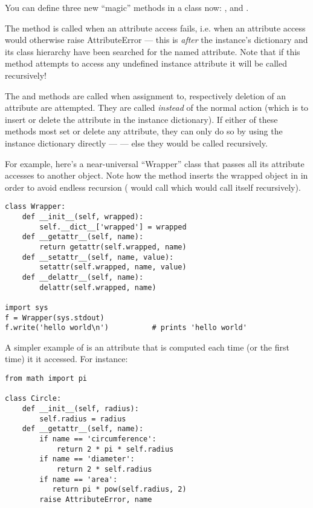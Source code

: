 You can define three new ``magic'' methods in a class now:
, 
and .

The  method is called when an attribute access fails,
i.e. when an attribute access would otherwise raise AttributeError ---
this is {\em after} the instance's dictionary and its class hierarchy
have been searched for the named attribute.  Note that if this method
attempts to access any undefined instance attribute it will be called
recursively!

The  and  methods are called when
assignment to, respectively deletion of an attribute are attempted.
They are called {\em instead} of the normal action (which is to insert
or delete the attribute in the instance dictionary).  If either of
these methods most set or delete any attribute, they can only do so by
using the instance dictionary directly ---  --- else
they would be called recursively.

For example, here's a near-universal ``Wrapper'' class that passes all
its attribute accesses to another object.  Note how the
 method inserts the wrapped object in
 in order to avoid endless recursion
( would call  which would call
itself recursively).

\begin{verbatim}
class Wrapper:
    def __init__(self, wrapped):
        self.__dict__['wrapped'] = wrapped
    def __getattr__(self, name):
        return getattr(self.wrapped, name)
    def __setattr__(self, name, value):
        setattr(self.wrapped, name, value)
    def __delattr__(self, name):
        delattr(self.wrapped, name)

import sys
f = Wrapper(sys.stdout)
f.write('hello world\n')          # prints 'hello world'
\end{verbatim}

A simpler example of  is an attribute that is
computed each time (or the first time) it it accessed.  For instance:

\begin{verbatim}
from math import pi

class Circle:
    def __init__(self, radius):
        self.radius = radius
    def __getattr__(self, name):
        if name == 'circumference':
            return 2 * pi * self.radius
        if name == 'diameter':
            return 2 * self.radius
        if name == 'area':
           return pi * pow(self.radius, 2)
        raise AttributeError, name
\end{verbatim}

